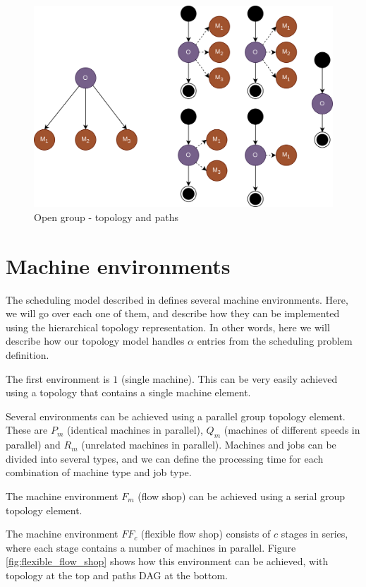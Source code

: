 \begin{figure}[!htbp]
	\centering
	\includegraphics[scale=0.3]{../images/open_group.png}
	\caption{Open group - topology and paths}
    \label{fig:open_group}
\end{figure}

\section{Machine environments}
\label{sec:machine_environments}
The scheduling model described in \citep{pinedo2016scheduling} defines several machine environments. Here, we will go over each one of them, and describe how they can be implemented using the hierarchical topology representation. In other words, here we will describe how our topology model handles $\alpha$ entries from the scheduling problem definition.

The first environment is $1$ (single machine). This can be very easily achieved using a topology that contains a single machine element.

Several environments can be achieved using a parallel group topology element. These are $P_m$ (identical machines in parallel), $Q_m$ (machines of different speeds in parallel) and $R_m$ (unrelated machines in parallel). Machines and jobs can be divided into several types, and we can define the processing time for each combination of machine type and job type.

The machine environment $F_m$ (flow shop) can be achieved using a serial group topology element.

The machine environment $FF_c$ (flexible flow shop) consists of $c$ stages in series, where each stage contains a number of machines in parallel. Figure \ref{fig:flexible_flow_shop} shows how this environment can be achieved, with topology at the top and paths DAG at the bottom.

